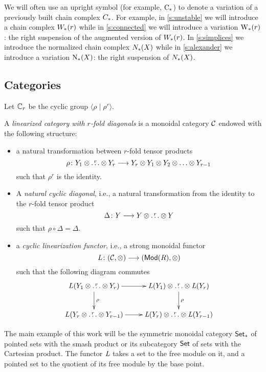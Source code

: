 \begin{notation}
	We will often use an upright symbol (for example, $\operatorname{C}_{*}$) to denote a variation of a previously built chain complex $C_{*}$. For example, in \cref{s:unstable} we will introduce a chain complex $W_{*}(r)$ while in \cref{s:connected} we will introduce a variation $\operatorname{W}_{*}(r)$: the right suspension of the augmented version of $W_{*}(r)$. In \cref{s:simplices} we introduce the normalized chain complex $N_{*}(X)$ while in \cref{s:alexander} we introduce a variation $\operatorname{N}_{*}(X)$: the right suspension of $N_{*}(X)$.
\end{notation}


\subsection{Categories}\label{s:categories}

Let $\mathbb{C}_r$ be the cyclic group $\langle\rho\mid \rho^r\rangle$.
\begin{definition}
	A \emph{linearized category with $r$-fold diagonals} is a monoidal category $\mathcal{C}$ endowed with the following structure:
	\begin{itemize}
		\item a natural transformation between $r$-fold tensor products
		\[
		\rho \colon Y_1 \ot \overset{r}{\dots} \ot Y_r \lra Y_r \ot Y_1 \ot Y_2 \ot \dots \ot Y_{r-1}
		\]
		such that $\rho^r$ is the identity.
		\item A \emph{natural cyclic diagonal}, i.e., a natural transformation from the identity to the $r$-fold tensor product
		\[
		\Delta \colon Y \longrightarrow Y \otimes \overset{r}{\dots} \otimes Y
		\]
		such that $\rho\circ \Delta = \Delta$.
		\item a \emph{cyclic linearization functor}, i.e., a strong monoidal functor
		\[
		\operatorname{{\it L}} \colon (\mathcal{C}, \otimes ) \longrightarrow (\mathsf{Mod}(R), \otimes )
		\]
		such that the following diagram commutes
		\[
		\xymatrix{
			L(Y_1 \ot \overset{r}{\dots} \ot Y_r) \ar[r]\ar[d]^{\rho} & \abel(Y_1) \ot \overset{r}{\dots} \ot 	\abel(Y_r)\ar[d]^{\rho} \\
			L(Y_{r} \ot \overset{r}{\dots} \ot Y_{r-1}) \ar[r] & \abel(Y_r) \ot \overset{r}{\dots} \ot \abel(Y_{r-1}) }
		\]
	\end{itemize}
\end{definition}
The main example of this work will be the symmetric monoidal category $\mathsf{Set}_*$ of pointed sets with the smash product or its subcategory $\mathsf{Set}$ of sets with the Cartesian product. The functor $\operatorname{{\it L}}$ takes a set to the free module on it, and a pointed set to the quotient of its free module by the base point.


